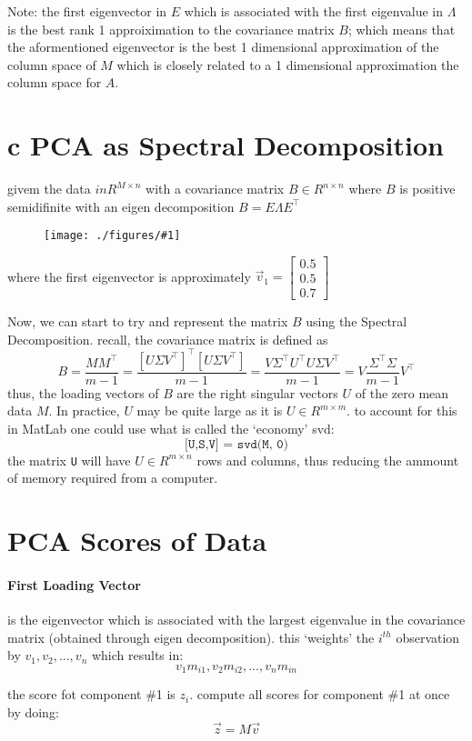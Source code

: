 \documentclass[12pt]{book}
\newcommand{\incimg}[2]{%
       \begin{figure}[h]
               \centering
               \texttt{[image: ./figures/\#1]}
       \end{figure}
}
\begin{document}
Note: the first eigenvector in $E$ which is associated with the first eigenvalue in $\Lambda$
is the best rank 1 approiximation to the covariance matrix $B$; which means that the aformentioned
eigenvector is the best 1 dimensional approximation of the column space of $M$ which is closely
related to a 1 dimensional approximation the column space for $A$.

\section*{c PCA as Spectral Decomposition}
givem the data $in R^{M\times n}$ with a covariance matrix $B\in R^{n\times n}$ where $B$ is 
positive semidifinite with an eigen decomposition $B = E\Lambda E^\top$
\incimg{Edecomp}{0.5}

where the first eigenvector is approximately 
$\vec v_1 = \begin{bmatrix} 0.5\\0.5\\0.7 \end{bmatrix}$

Now, we can start to try and represent the matrix $B$ using the Spectral Decomposition.
recall, the covariance matrix is defined as
\[B = \frac{MM^\top}{m-1} = \frac{[U\Sigma V^\top]^\top [U\Sigma V^\top]}{m-1}
 = \frac{V\Sigma^\top U^\top U\Sigma V^\top}{m-1} = V\frac{\Sigma^\top \Sigma}{m-1}V^\top\]
 thus, the loading vectors of $B$ are the right singular vectors $U$ of the zero mean data $M$.
 In practice, $U$ may be quite large as it is $U\in R^{m\times m}$. to account for this in
 MatLab one could use what is called the `economy' svd:
 \[\texttt{[U,S,V] = svd(M, 0)}\]
 the matrix \texttt{U} will have $U\in R^{m\times n}$ rows and columns, thus reducing the ammount
 of memory required from a computer.

 \section*{PCA Scores of Data}
 \paragraph{First Loading Vector} 
is the eigenvector which is associated with the
largest eigenvalue in the covariance matrix (obtained through eigen decomposition).
this `weights' the $i^{th}$ observation by $v_1, v_2, ..., v_n$ which results in:
 \[v_1m_{i1},v_2m_{i2},...,v_nm_{in}\]

 the score fot component \#1 is $z_i$. compute all scores for component \#1 at once by doing:
 \[\vec z = M\vec v\]
\end{document}

